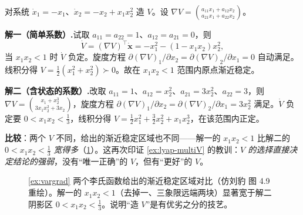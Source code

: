 \begin{example}\label{ex:vargrad}
对系统 $\dot x_1=-x_1$、$\dot x_2=-x_2+x_1x_2^2$ 造 $V$。设 $\nabla V=\binom{a_{11}x_1+a_{12}x_2}{a_{21}x_1+a_{22}x_2}$。

\textbf{解一（简单系数）.}\;试取 $a_{11}=a_{22}=1$、$a_{12}=a_{21}=0$，则
\[
  \dot V=(\nabla V)^\top\dot{\mathbf{x}}=-x_1^2-(1-x_1x_2)x_2^2,
\]
当 $x_1x_2<1$ 时 $\dot V$ 负定。旋度方程 $\partial(\nabla V)_1/\partial x_2=\partial(\nabla V)_2/\partial x_1=0$ 自动满足。线积分得 $V=\tfrac12(x_1^2+x_2^2)\succ0$。故在 $x_1x_2<1$ 范围内原点渐近稳定。

\textbf{解二（含状态的系数）.}\;改取 $a_{11}=1$、$a_{12}=x_2^2$、$a_{21}=3x_2^2$、$a_{22}=3$，则 $\nabla V=\binom{x_1+x_2^3}{3x_1x_2^2+3x_2}$，旋度方程 $\partial(\nabla V)_1/\partial x_2=\partial(\nabla V)_2/\partial x_1=3x_2^2$ 满足。$\dot V$ 负定要 $0<x_1x_2<\tfrac13$，线积分得 $V=\tfrac12x_1^2+\tfrac32x_2^2+x_1x_2^3$，在该范围内正定。

\textbf{比较}：两个 $V$ 不同，给出的渐近稳定区域也不同——解一的 $x_1x_2<1$ 比解二的 $0<x_1x_2<\tfrac13$ \emph{宽得多}（\cref{fig:stab-region}）。这再次印证 \cref{ex:lyap-multiV} 的教训：\emph{$V$ 的选择直接决定结论的强弱}，没有“唯一正确”的 $V$，但有“更好”的 $V$。
\end{example}

\begin{figure}[H]
\centering
{}
\caption{\cref{ex:vargrad} 两个李氏函数给出的渐近稳定区域对比（仿刘豹\cite{liubao2006modern} 图 4.9 重绘）。解一的 $x_1x_2<1$（去掉一、三象限远端两块）显著宽于解二阴影区 $0<x_1x_2<\tfrac13$。说明“造 $V$”是有优劣之分的技艺。}
\label{fig:stab-region}
\end{figure}

